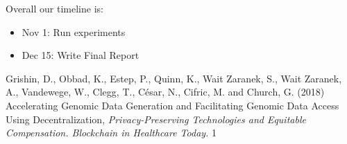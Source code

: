 \documentclass[pdftex,twocolumn,10pt,letterpaper]{article}
\begin{document}
Overall our timeline is:

\begin{itemize}
  \item Nov 1: Run experiments 
  \item Dec 15: Write Final Report
\end{itemize}

{


}

\begin{thebibliography}{9}
Grishin, D., Obbad, K., Estep, P., Quinn, K., Wait Zaranek, S., Wait Zaranek, A., Vandewege, W., Clegg, T., César, N., Cifric, M. and Church, G.
(2018) Accelerating Genomic Data Generation and Facilitating Genomic Data Access Using Decentralization,
\textit{Privacy-Preserving Technologies and Equitable Compensation. Blockchain in Healthcare Today. }
1



\end{thebibliography}
\end{document}
